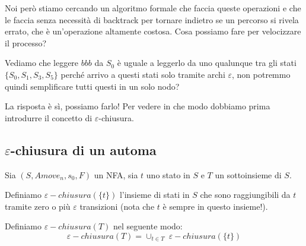 \documentclass[class=book, crop=false, oneside, 12pt]{standalone}
\begin{document}
Noi però stiamo cercando un algoritmo formale che faccia queste operazioni e che le faccia senza necessità di backtrack per tornare indietro se un percorso si rivela errato, che è un'operazione altamente costosa.
Cosa possiamo fare per velocizzare il processo?

Vediamo che leggere \(bbb\) da \(S_0\) è uguale a leggerlo da uno qualunque tra gli stati \(\{S_0, S_1, S_3, S_5\}\) perché arrivo a questi stati solo tramite archi \(\varepsilon\), non potremmo quindi semplificare tutti questi in un solo nodo?

La risposta è sì, possiamo farlo! Per vedere in che modo dobbiamo prima introdurre il concetto di \(\varepsilon\)-chiusura.


\subsection{\(\varepsilon\)-chiusura di un automa}
Sia \((S, A move_n, s_0, F)\) un NFA, sia \(t\) uno stato in \(S\) e \(T\) un sottoinsieme di \(S\).

Definiamo \(\varepsilon-chiusura(\{t\})\) l’insieme di stati in \(S\) che sono raggiungibili da \(t\) tramite zero o più \(\varepsilon\) transizioni (nota che \(t\) è sempre in questo insieme!).

Definiamo \(\varepsilon-chiusura(T)\) nel seguente modo:
\begin{equation}
    \varepsilon-chiusura(T) = \cup_{t \in T} \;\varepsilon-chiusura(\{t\})
\end{equation} 
\end{document}
